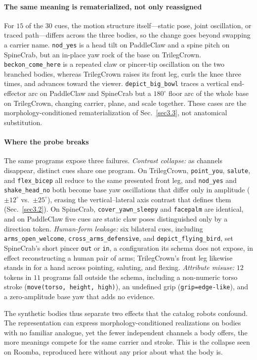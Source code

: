 \paragraph{The same meaning is rematerialized, not only reassigned}
For $15$ of the $30$ cues, the motion structure itself---static pose, joint oscillation, or traced path---differs across the three bodies, so the change goes beyond swapping a carrier name. \texttt{nod\_yes} is a head tilt on PaddleClaw and a spine pitch on SpineCrab, but an in-place yaw rock of the base on TrilegCrown. \texttt{beckon\_come\_here} is a repeated claw or pincer-tip oscillation on the two branched bodies, whereas TrilegCrown raises its front leg, curls the knee three times, and advances toward the viewer. \texttt{depict\_big\_bowl} traces a vertical end-effector arc on PaddleClaw and SpineCrab but a $180^{\circ}$ floor arc of the whole base on TrilegCrown, changing carrier, plane, and scale together. These cases are the morphology-conditioned rematerialization of Sec.~\ref{sec3.3}, not anatomical substitution.

\paragraph{Where the probe breaks}
The same programs expose three failures. \emph{Contrast collapse:} as channels disappear, distinct cues share one program. On TrilegCrown, \texttt{point\_you}, \texttt{salute}, and \texttt{flex\_bicep} all reduce to the same presented front leg, and \texttt{nod\_yes} and \texttt{shake\_head\_no} both become base yaw oscillations that differ only in amplitude ($\pm12^{\circ}$ vs.\ $\pm25^{\circ}$), erasing the vertical--lateral axis contrast that defines them (Sec.~\ref{sec3.2}). On SpineCrab, \texttt{cover\_yawn\_sleepy} and \texttt{facepalm} are identical, and on PaddleClaw five cues are static claw poses distinguished only by a direction token. \emph{Human-form leakage:} six bilateral cues, including \texttt{arms\_open\_welcome}, \texttt{cross\_arms\_defensive}, and \texttt{depict\_flying\_bird}, set SpineCrab's short pincer \texttt{out} or \texttt{in}, a configuration its schema does not expose, in effect reconstructing a human pair of arms; TrilegCrown's front leg likewise stands in for a hand across pointing, saluting, and flexing. \emph{Attribute misuse:} $12$ tokens in $11$ programs fall outside the schema, including a non-numeric torso stroke (\texttt{move(torso, height, high)}), an undefined grip (\texttt{grip=edge-like}), and a zero-amplitude base yaw that adds no evidence.

The synthetic bodies thus separate two effects that the catalog robots confound. The representation can express morphology-conditioned realizations on bodies with no familiar analogue, yet the fewer independent channels a body offers, the more meanings compete for the same carrier and stroke. This is the collapse seen on Roomba, reproduced here without any prior about what the body is.
